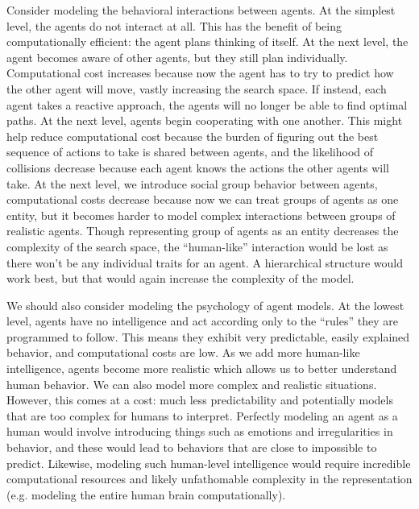 \documentclass[tog]{acmsiggraph}
\begin{document}
Consider modeling the behavioral interactions between agents. At the simplest level, the agents do not interact at all. This has the benefit of being computationally efficient: the agent plans thinking of itself. At the next level, the agent becomes aware of other agents, but they still plan individually. Computational cost increases because now the agent has to try to predict how the other agent will move, vastly increasing the search space. If instead, each agent takes a reactive approach, the agents will no longer be able to find optimal paths. At the next level, agents begin cooperating with one another. This might help reduce computational cost because the burden of figuring out the best sequence of actions to take is shared between agents, and the likelihood of collisions decrease because each agent knows the actions the other agents will take. At the next level, we introduce social group behavior between agents, computational costs decrease because now we can treat groups of agents as one entity, but it becomes harder to model complex interactions between groups of realistic agents. Though representing group of agents as an entity decreases the complexity of the search space, the ``human-like'' interaction would be lost as there won't be any individual traits for an agent. A hierarchical structure would work best, but that would again increase the complexity of the model.

We should also consider modeling the psychology of agent models. At the lowest level, agents have no intelligence and act according only to the ``rules'' they are programmed to follow. This means they exhibit very predictable, easily explained behavior, and computational costs are low. As we add more human-like intelligence, agents become more realistic which allows us to better understand human behavior. We can also model more complex and realistic situations. However, this comes at a cost: much less predictability and potentially models that are too complex for humans to interpret. Perfectly modeling an agent as a human would involve introducing things such as emotions and irregularities in behavior, and these would lead to behaviors that are close to impossible to predict. Likewise, modeling such human-level intelligence would require incredible computational resources and likely unfathomable complexity in the representation (e.g. modeling the entire human brain computationally).
\end{document}
